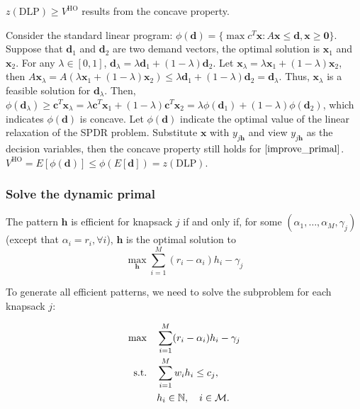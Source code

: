 
\begin{lem}
$z(\text{DLP}) \geq V^{\text{HO}}$ results from the concave property. 
\end{lem}

Consider the standard linear program: $\phi(\bm{d})= \{\max c^{T} \bm{x}: A \bm{x} \leq \bm{d}, \bm{x} \geq \bm{0}\}$.  Suppose that $\bm{d}_1$ and $\bm{d}_2$ are two demand vectors, the optimal solution is $\bm{x}_1$ and $\bm{x}_2$. For any $\lambda \in [0, 1]$, $\bm{d}_{\lambda} = \lambda \bm{d}_{1} + (1- \lambda) \bm{d}_{2}$. Let $\bm{x}_{\lambda} = \lambda \bm{x}_{1} + (1-\lambda) \bm{x}_{2}$, then $A \bm{x}_{\lambda} = A(\lambda \bm{x}_{1} + (1-\lambda) \bm{x}_{2}) \leq \lambda \bm{d}_{1} + (1- \lambda) \bm{d}_{2} = \bm{d}_{\lambda}$. Thus, $\bm{x}_{\lambda}$ is a feasible solution for $\bm{d}_{\lambda}$. Then, $\phi(\bm{d}_{\lambda}) \geq \bm{c}^{T} \bm{x}_{\lambda} = \lambda \bm{c}^{T} \bm{x}_{1} + (1-\lambda) \bm{c}^{T} \bm{x}_{2} = \lambda \phi(\bm{d}_{1}) + (1- \lambda) \phi(\bm{d}_{2})$, which indicates $\phi(\bm{d})$ is concave. Let $\phi(\bm{d})$ indicate the optimal value of the linear relaxation of the SPDR problem. Substitute $\bm{x}$ with $y_{j \bm{h}}$ and view $y_{j \bm{h}}$ as the decision variables, then the concave property still holds for $\eqref{improve_primal}$. $V^{\text{HO}} = E[\phi(\bm{d})] \leq \phi(E[\bm{d}]) = z(\text{DLP})$.

\subsubsection{Solve the dynamic primal}

The pattern $\bm{h}$ is efficient for knapsack $j$ if and only if, for some $(\alpha_{1}, \ldots, \alpha_{M}, \gamma_{j})$ (except that $\alpha_{i} = r_i, \forall i$), $\bm{h}$ is the optimal solution to $$\max_{\bm{h}} \sum_{i=1}^{M} (r_i - \alpha_{i}) h_{i} - \gamma_{j}$$

To generate all efficient patterns, we need to solve the subproblem for each knapsack $j$:

\begin{align}\label{subproblem}
    \max \quad & \sum_{i=1}^{M} (r_i - \alpha_{i}) h_{i} - \gamma_{j} \\
    \text {s.t.} \quad & \sum_{i= 1}^{M} w_{i} h_{i} \leq c_j, \notag \\
    & h_{i} \in \mathbb{N}, \quad i \in \mathcal{M}. \notag
\end{align} 


